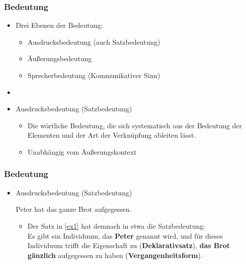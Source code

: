 
\begin{frame}
\frametitle{Bedeutung}

\begin{itemize}
	\item Drei Ebenen der Bedeutung:
	
	\begin{itemize}
		\item Ausdrucksbedeutung (auch Satzbedeutung)
		\item Äußerungsbedeutung
		\item Sprecherbedeutung (Kommunikativer Sinn)
	\end{itemize}
	
	\item[]
	\item Ausdrucksbedeutung (Satzbedeutung)
	
	\begin{itemize}
		\item Die wörtliche Bedeutung, die sich systematisch aus der Bedeutung der Elementen und der Art der Verknüpfung ableiten lässt.
		\item Unabhängig vom Äußerungskontext
	\end{itemize}

\end{itemize}

\end{frame}



\begin{frame}
\frametitle{Bedeutung}

\begin{itemize}
	\item Ausdrucksbedeutung (Satzbedeutung)
	
	\ea \label{ex1}Peter hat das ganze Brot aufgegessen.
	\z
	
	\begin{itemize}
		\item Der Satz in \ref{ex1} hat demnach in etwa die Satzbedeutung:\\
		\vspace{5mm}
		Es gibt ein Individuum, das \textbf{Peter} genannt wird,
und für dieses Individuum trifft die Eigenschaft zu (\textbf{Deklarativsatz}),
\textbf{das Brot gänzlich} aufgegessen zu haben (\textbf{Vergangenheitsform}).
	\end{itemize}
	
\end{itemize}

\end{frame}


